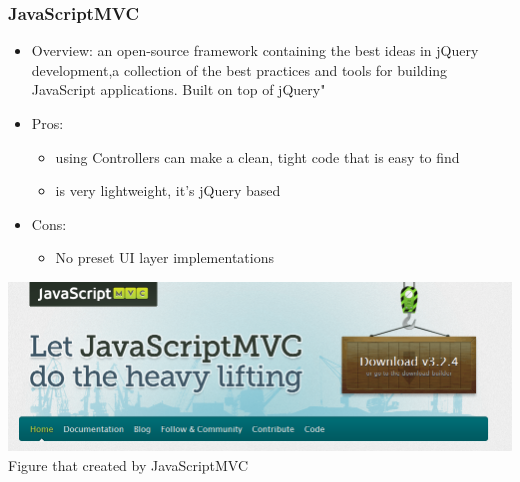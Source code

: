 \documentclass[14pt,a4paper]{extreport}
\begin{document}
		\subsubsection{JavaScriptMVC}
			\begin{itemize}
				\item Overview: an open-source framework containing the best ideas in jQuery development,a collection of the best practices and tools for building JavaScript applications. Built on top of jQuery"
				\item Pros: 
					\begin{itemize}
						\item using Controllers can make a clean, tight code that is easy to find
						\item is very lightweight, it's jQuery based
						
					\end{itemize}
				\item Cons:
					\begin{itemize}
						\item No preset UI layer implementations
						
					\end{itemize}
			\end{itemize}
			\begin{center}
			\includegraphics[scale=0.6]{javamvc.png}
			Figure that created by JavaScriptMVC
			\end{center}
\end{document}
